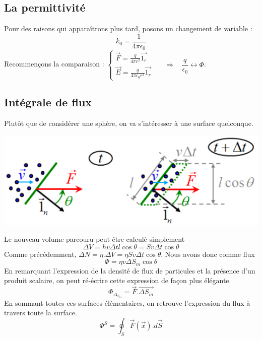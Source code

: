 \documentclass	[11pt, a4paper, openany]{book}
\begin{document}
\subsection{La permittivité}
Pour des raisons qui apparaîtrons plus tard, posons un changement de variable :
\begin{equation}
k_0 = \frac{1}{4\pi \epsilon_0}
\end{equation}
Recommençons la comparaison : $\left\{\begin{array}{l}
\vec{F} = \frac{q}{4\pi r^2}\vec{1_r}\\
\vec{E} = \frac{q}{4\pi \epsilon_0 r^2}\vec{1_r}
\end{array}\right.$\ \ \ $\Rightarrow\ \ \ \ \dfrac{q}{\epsilon_0} \leftrightarrow \Phi$.

\subsection{Intégrale de flux}
Plutôt que de considérer une sphère, on va s'intéresser à une surface quelconque.
\begin{center}
\includegraphics[scale=0.5]{es/image7.png}
\end{center}
Le nouveau volume parcouru peut être calculé simplement
\begin{equation}
\Delta V = hv\Delta t l \cos\theta = S v \Delta t \cos\theta
\end{equation}
Comme précédemment, $\Delta N = \eta . \Delta V = \eta S v \Delta t \cos\theta$. Nous avons donc comme flux
\begin{equation}
\Phi = \eta v \Delta S_m \cos\theta
\end{equation}
En remarquant l'expression de la densité de flux de particules et la présence d'un produit scalaire, on peut ré-écrire cette expression de façon plus élégante.
\begin{equation}
\Phi_{\Delta_{S_m}} = \vec{F}.\vec{\Delta S_m}
\end{equation}
En sommant toutes ces surfaces élémentaires, on retrouve l'expression du flux à travers toute la surface.
\begin{equation}
\Phi^S = \oint_S \vec{F}(\vec x).d\vec{S}
\end{equation}
\end{document}
